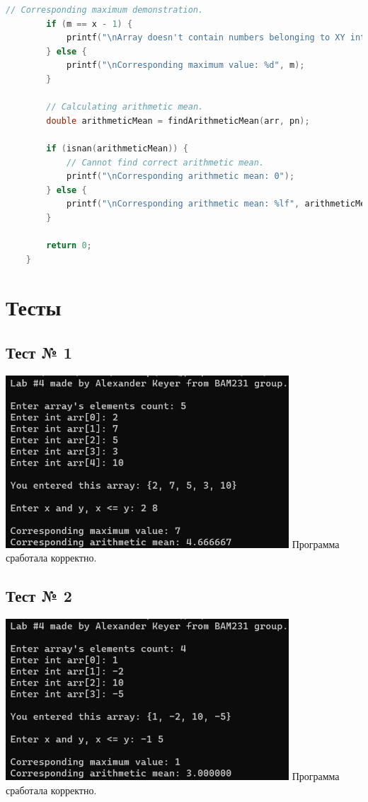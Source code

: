 \documentclass[12pt]{article}
\begin{document}
\begin{lstlisting}[language=C]
		// Corresponding maximum demonstration.
		if (m == x - 1) {
			printf("\nArray doesn't contain numbers belonging to XY interval.");
		} else {
			printf("\nCorresponding maximum value: %d", m);
		}
		
		// Calculating arithmetic mean.
		double arithmeticMean = findArithmeticMean(arr, pn);
		
		if (isnan(arithmeticMean)) {
			// Cannot find correct arithmetic mean.
			printf("\nCorresponding arithmetic mean: 0");
		} else {
			printf("\nCorresponding arithmetic mean: %lf", arithmeticMean);
		}
		
		return 0;
	}
	\end{lstlisting}
	
	\newpage
	
	\section*{Тесты}
	
	\subsection*{Тест № 1}
	\includegraphics[width=400px]{test_1}
	Программа сработала корректно.
	
	\subsection*{Тест № 2}
	\includegraphics[width=400px]{test_2}
	Программа сработала корректно.
	
\end{document}
